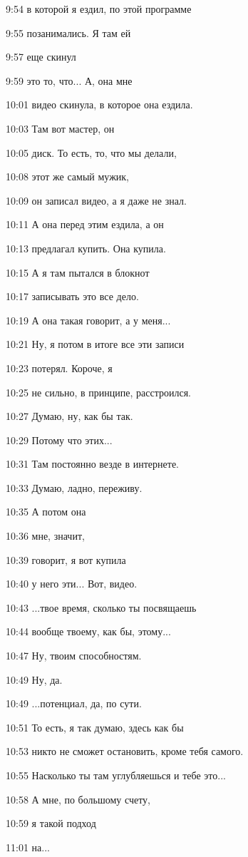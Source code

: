 9:54
в которой я ездил, по этой программе

9:55
позанимались. Я там ей

9:57
еще скинул

9:59
это то, что... А, она мне

10:01
видео скинула, в которое она ездила.

10:03
Там вот мастер, он

10:05
диск. То есть, то, что мы делали,

10:08
этот же самый мужик,

10:09
он записал видео, а я даже не знал.

10:11
А она перед этим ездила, а он

10:13
предлагал купить. Она купила.

10:15
А я там пытался в блокнот

10:17
записывать это все дело.

10:19
А она такая говорит, а у меня...

10:21
Ну, я потом в итоге все эти записи

10:23
потерял. Короче, я

10:25
не сильно, в принципе, расстроился.

10:27
Думаю, ну, как бы так.

10:29
Потому что этих...

10:31
Там постоянно везде в интернете.

10:33
Думаю, ладно, переживу.

10:35
А потом она

10:36
мне, значит,

10:39
говорит, я вот купила

10:40
у него эти... Вот, видео.

10:43
...твое время, сколько ты посвящаешь

10:44
вообще твоему, как бы, этому...

10:47
Ну, твоим способностям.

10:49
Ну, да.

10:49
...потенциал, да, по сути.

10:51
То есть, я так думаю, здесь как бы

10:53
никто не сможет остановить, кроме тебя самого.

10:55
Насколько ты там углубляешься и тебе это...

10:58
А мне, по большому счету,

10:59
я такой подход

11:01
на...

